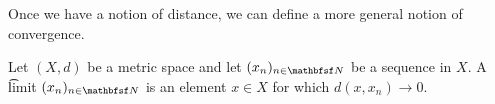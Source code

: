 

Once we have a notion of distance, we
can define a more general notion of
convergence.


Let $(X, d)$ be a metric space and let $(x_n)_{n \in \N}$ be a sequence in $X$.
A \t{limit} $(x_n)_{n \in \N}$ is an element $x \in X$ for which $d(x, x_n) \to 0$.

